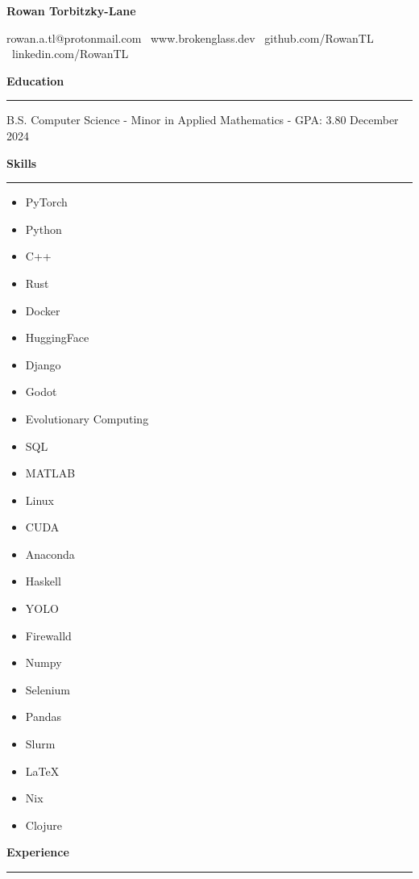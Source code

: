 \documentclass[11pt]{article}
\begin{document}
\begin{center}
    \textbf{\huge Rowan Torbitzky-Lane}\\
    \hrulefill
\end{center}

\begin{center}
    rowan.a.tl@protonmail.com \textbullet \ www.brokenglass.dev \textbullet \ github.com/RowanTL \textbullet  \ linkedin.com/RowanTL
\end{center}

\textbf{Education}\par
\vspace{-12pt}
\noindent\rule{\textwidth}{0.4pt}

B.S. Computer Science - Minor in Applied Mathematics - GPA: 3.80 \hfill December 2024

\textbf{Skills}\par
\vspace{-12pt}
\noindent\rule{\textwidth}{0.4pt}
\vspace{-24pt}  %
\begin{multicols}{3}
    \begin{itemize}[noitemsep, topsep=0pt, partopsep=0pt, parsep=0pt, itemsep=0pt]
        \small
        \item PyTorch
        \item Python
        \item C++
        \item Rust
        \item Docker
        \item HuggingFace
        \item Django
        \item Godot
        \item Evolutionary Computing
        \item SQL
        \item MATLAB
        \item Linux
        \item CUDA
        \item Anaconda
        \item Haskell
        \item YOLO
        \item Firewalld
        \item Numpy
        \item Selenium
        \item Pandas
        \item Slurm
        \item LaTeX
        \item Nix
        \item Clojure
    \end{itemize}
\end{multicols}
\vspace{-10pt}  %
\textbf{Experience}\par
\vspace{-12pt}
\noindent\rule{\textwidth}{0.4pt}
\end{document}
